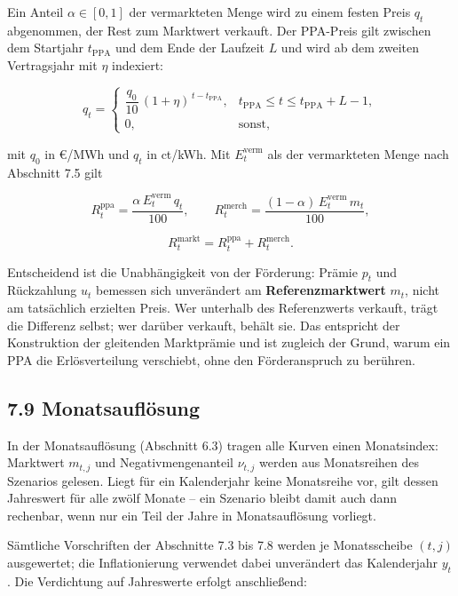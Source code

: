 \documentclass[
  a4paper,
  10pt]{article}
\begin{document}
Ein Anteil \(\alpha \in [0,1]\) der vermarkteten Menge wird zu einem
festen Preis \(q_t\) abgenommen, der Rest zum Marktwert verkauft. Der
PPA-Preis gilt zwischen dem Startjahr \(t_{\mathrm{PPA}}\) und dem Ende
der Laufzeit \(L\) und wird ab dem zweiten Vertragsjahr mit \(\eta\)
indexiert:

\[
q_t =
\begin{cases}
\dfrac{q_0}{10}\,(1+\eta)^{\,t-t_{\mathrm{PPA}}}, & t_{\mathrm{PPA}} \leq t \leq t_{\mathrm{PPA}}+L-1,\\[6pt]
0, & \text{sonst},
\end{cases}
\]

mit \(q_0\) in €/MWh und \(q_t\) in ct/kWh. Mit \(E^{\mathrm{verm}}_t\)
als der vermarkteten Menge nach Abschnitt 7.5 gilt

\[ R^{\mathrm{ppa}}_t = \frac{\alpha\,E^{\mathrm{verm}}_t\,q_t}{100}, \qquad R^{\mathrm{merch}}_t = \frac{(1-\alpha)\,E^{\mathrm{verm}}_t\,m_t}{100}, \]

\[ R^{\mathrm{markt}}_t = R^{\mathrm{ppa}}_t + R^{\mathrm{merch}}_t. \]

Entscheidend ist die Unabhängigkeit von der Förderung: Prämie \(p_t\)
und Rückzahlung \(u_t\) bemessen sich unverändert am
\textbf{Referenzmarktwert} \(m_t\), nicht am tatsächlich erzielten
Preis. Wer unterhalb des Referenzwerts verkauft, trägt die Differenz
selbst; wer darüber verkauft, behält sie. Das entspricht der
Konstruktion der gleitenden Marktprämie und ist zugleich der Grund,
warum ein PPA die Erlösverteilung verschiebt, ohne den Förderanspruch zu
berühren.

\hypertarget{monatsaufluxf6sung}{%
\subsection{7.9 Monatsauflösung}\label{monatsaufluxf6sung}}

In der Monatsauflösung (Abschnitt 6.3) tragen alle Kurven einen
Monatsindex: Marktwert \(m_{t,j}\) und Negativmengenanteil \(\nu_{t,j}\)
werden aus Monatsreihen des Szenarios gelesen. Liegt für ein
Kalenderjahr keine Monatsreihe vor, gilt dessen Jahreswert für alle
zwölf Monate -- ein Szenario bleibt damit auch dann rechenbar, wenn nur
ein Teil der Jahre in Monatsauflösung vorliegt.

Sämtliche Vorschriften der Abschnitte 7.3 bis 7.8 werden je
Monatsscheibe \((t,j)\) ausgewertet; die Inflationierung verwendet dabei
unverändert das Kalenderjahr \(y_t\). Die Verdichtung auf Jahreswerte
erfolgt anschließend:
\end{document}
